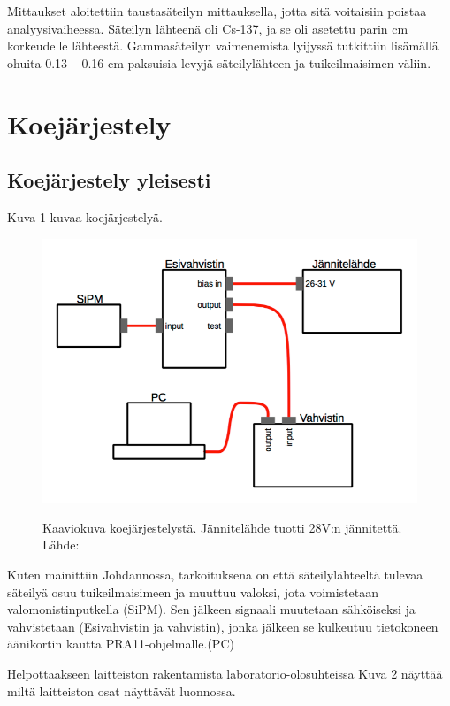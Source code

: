 \documentclass[a4paper, 12pt]{article}
\begin{document}
Mittaukset aloitettiin taustasäteilyn mittauksella, jotta sitä voitaisiin poistaa analyysivaiheessa. Säteilyn lähteenä oli Cs-137, ja se oli asetettu parin cm korkeudelle lähteestä. Gammasäteilyn vaimenemista lyijyssä tutkittiin lisämällä ohuita 0.13 -- 0.16 cm paksuisia levyjä säteilylähteen ja tuikeilmaisimen väliin.

\section{Koejärjestely}
\subsection{Koejärjestely yleisesti}
Kuva 1 kuvaa koejärjestelyä. 

\begin{figure}[!hbt]
\includegraphics[scale=0.7]{Koejarjestely}
\label{fig:Koejarjestely}
\caption{Kaaviokuva koejärjestelystä. Jännitelähde tuotti 28V:n jännitettä. Lähde: \cite{TyoMoniste}}
\end{figure}

Kuten mainittiin Johdannossa, tarkoituksena on että säteilylähteeltä tulevaa säteilyä osuu tuikeilmaisimeen ja muuttuu valoksi, jota voimistetaan valomonistinputkella (SiPM). Sen jälkeen signaali muutetaan sähköiseksi ja vahvistetaan (Esivahvistin ja vahvistin), jonka jälkeen se kulkeutuu tietokoneen äänikortin kautta PRA11-ohjelmalle.(PC)

Helpottaakseen laitteiston rakentamista laboratorio-olosuhteissa Kuva 2 näyttää miltä laitteiston osat näyttävät luonnossa.
\end{document}
